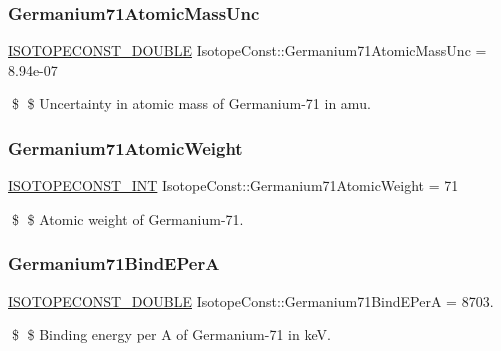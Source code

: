 \subsubsection{\texorpdfstring{Germanium71\+Atomic\+Mass\+Unc}{Germanium71AtomicMassUnc}}
{\footnotesize\ttfamily \mbox{\hyperlink{group___isotope_const-_macros_ga8f45a7272ce02c0b4c65c44636ed719a}{I\+S\+O\+T\+O\+P\+E\+C\+O\+N\+S\+T\+\_\+\+D\+O\+U\+B\+LE}} Isotope\+Const\+::\+Germanium71\+Atomic\+Mass\+Unc = 8.\+94e-\/07}

\$ \$ Uncertainty in atomic mass of Germanium-\/71 in amu. \mbox{\label{group___isotope_const-_germanium-_ge71_gadb4d7b78da3662143cbd30d9a7f00c9e}} 
\subsubsection{\texorpdfstring{Germanium71\+Atomic\+Weight}{Germanium71AtomicWeight}}
{\footnotesize\ttfamily \mbox{\hyperlink{group___isotope_const-_macros_ga5f18360b3e99483a35c32d789e62621c}{I\+S\+O\+T\+O\+P\+E\+C\+O\+N\+S\+T\+\_\+\+I\+NT}} Isotope\+Const\+::\+Germanium71\+Atomic\+Weight = 71}

\$ \$ Atomic weight of Germanium-\/71. \mbox{\label{group___isotope_const-_germanium-_ge71_gac506b8240e0f42de253b4119793021ea}} 
\subsubsection{\texorpdfstring{Germanium71\+Bind\+E\+PerA}{Germanium71BindEPerA}}
{\footnotesize\ttfamily \mbox{\hyperlink{group___isotope_const-_macros_ga8f45a7272ce02c0b4c65c44636ed719a}{I\+S\+O\+T\+O\+P\+E\+C\+O\+N\+S\+T\+\_\+\+D\+O\+U\+B\+LE}} Isotope\+Const\+::\+Germanium71\+Bind\+E\+PerA = 8703.}

\$ \$ Binding energy per A of Germanium-\/71 in keV. \mbox{\label{group___isotope_const-_germanium-_ge71_gaf27fb3d1c1a6662e68dcef25d527f757}} 
